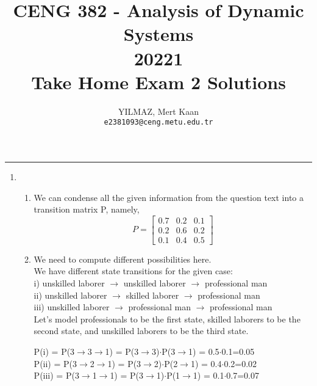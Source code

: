 \documentclass[12pt,a4paper, margin=1in]{article}
\author{
  YILMAZ, Mert Kaan\\
  \texttt{e2381093@ceng.metu.edu.tr}
}
\title{CENG 382 - Analysis of Dynamic Systems \\
20221\\
Take Home Exam 2 Solutions}
\begin{document}
\maketitle

\noindent\rule{19cm}{1.2pt}

\begin{enumerate}

    \item %
        \begin{enumerate}
            \item We can condense all the given information from the question text into a transition matrix P, namely,\\
            \begin{equation*}
            P = 
            \begin{bmatrix}
                0.7 & 0.2 & 0.1\\
                0.2 & 0.6 & 0.2\\
                0.1 & 0.4 & 0.5
            \end{bmatrix}
            \end{equation*}
            
            \item We need to compute different possibilities here.\\
            We have different state transitions for the given case:\\
            i) unskilled laborer $\rightarrow$ unskilled laborer $\rightarrow$ professional man\\
            ii) unskilled laborer $\rightarrow$ skilled laborer $\rightarrow$ professional man\\
            iii) unskilled laborer $\rightarrow$ professional man $\rightarrow$ professional man\\

            Let's model professionals to be the first state, skilled laborers to be the second state, and unskilled laborers to be the third state.

            P(i) = P(3$\rightarrow$3$\rightarrow$1) = P(3$\rightarrow$3)$\cdot$P(3$\rightarrow$1) = 0.5$\cdot$0.1=0.05\\
            P(ii) = P(3$\rightarrow$2$\rightarrow$1) = P(3$\rightarrow$2)$\cdot$P(2$\rightarrow$1) = 0.4$\cdot$0.2=0.02\\
            P(iii) = P(3$\rightarrow$1$\rightarrow$1) = P(3$\rightarrow$1)$\cdot$P(1$\rightarrow$1) = 0.1$\cdot$0.7=0.07\\


\end{enumerate}
\end{enumerate}
\end{document}
